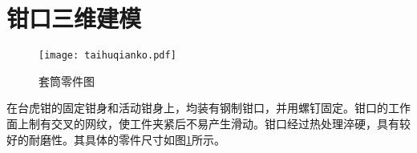 \section{钳口三维建模}

\begin{figure}[htbp]
\centering
\texttt{[image: taihuqianko.pdf]}
\caption{套筒零件图}\label{fig:taihuqianko}
\end{figure}

在台虎钳的固定钳身和活动钳身上，均装有钢制钳口，并用螺钉固定。钳口的工作面上制有交叉的网纹，使工件夹紧后不易产生滑动。钳口经过热处理淬硬，具有较好的耐磨性。其具体的零件尺寸如图\ref{fig:taihuqianko}所示。
\endinput